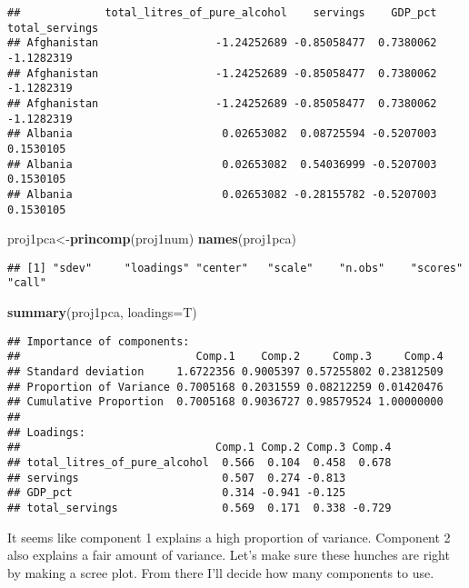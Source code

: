 \documentclass[]{article}
\newenvironment{Shaded}{\begin{snugshade}}{\end{snugshade}}
\newcommand{\KeywordTok}[1]{\textcolor[rgb]{0.13,0.29,0.53}{\textbf{#1}}}
\newcommand{\DataTypeTok}[1]{\textcolor[rgb]{0.13,0.29,0.53}{#1}}
\newcommand{\NormalTok}[1]{#1}
\begin{document}
\begin{verbatim}
##             total_litres_of_pure_alcohol    servings    GDP_pct total_servings
## Afghanistan                  -1.24252689 -0.85058477  0.7380062     -1.1282319
## Afghanistan                  -1.24252689 -0.85058477  0.7380062     -1.1282319
## Afghanistan                  -1.24252689 -0.85058477  0.7380062     -1.1282319
## Albania                       0.02653082  0.08725594 -0.5207003      0.1530105
## Albania                       0.02653082  0.54036999 -0.5207003      0.1530105
## Albania                       0.02653082 -0.28155782 -0.5207003      0.1530105
\end{verbatim}

\begin{Shaded}
\begin{Highlighting}[]
\NormalTok{proj1pca<-}\KeywordTok{princomp}\NormalTok{(proj1num)}
\KeywordTok{names}\NormalTok{(proj1pca)}
\end{Highlighting}
\end{Shaded}

\begin{verbatim}
## [1] "sdev"     "loadings" "center"   "scale"    "n.obs"    "scores"   "call"
\end{verbatim}

\begin{Shaded}
\begin{Highlighting}[]
\KeywordTok{summary}\NormalTok{(proj1pca, }\DataTypeTok{loadings=}\NormalTok{T)}
\end{Highlighting}
\end{Shaded}

\begin{verbatim}
## Importance of components:
##                           Comp.1    Comp.2     Comp.3     Comp.4
## Standard deviation     1.6722356 0.9005397 0.57255802 0.23812509
## Proportion of Variance 0.7005168 0.2031559 0.08212259 0.01420476
## Cumulative Proportion  0.7005168 0.9036727 0.98579524 1.00000000
## 
## Loadings:
##                              Comp.1 Comp.2 Comp.3 Comp.4
## total_litres_of_pure_alcohol  0.566  0.104  0.458  0.678
## servings                      0.507  0.274 -0.813       
## GDP_pct                       0.314 -0.941 -0.125       
## total_servings                0.569  0.171  0.338 -0.729
\end{verbatim}

It seems like component 1 explains a high proportion of variance.
Component 2 also explains a fair amount of variance. Let's make sure
these hunches are right by making a scree plot. From there I'll decide
how many components to use.
\end{document}
